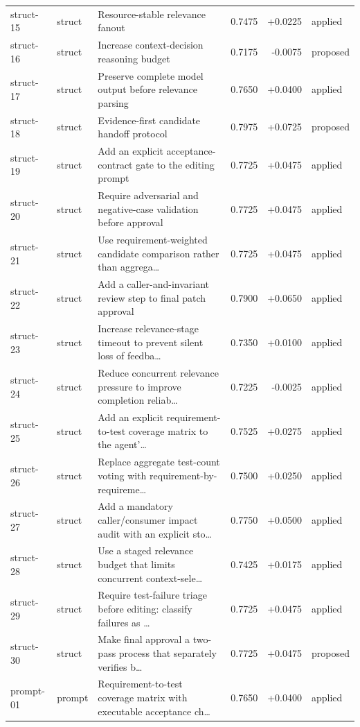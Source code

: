 \begin{center}
\begin{longtable}{llp{5.2cm}rrl}
struct-15 & struct & Resource-stable relevance fanout & 0.7475 & +0.0225 & applied \\
struct-16 & struct & Increase context-decision reasoning budget & 0.7175 & -0.0075 & proposed \\
struct-17 & struct & Preserve complete model output before relevance parsing & 0.7650 & +0.0400 & applied \\
struct-18 & struct & Evidence-first candidate handoff protocol & 0.7975 & +0.0725 & proposed \\
struct-19 & struct & Add an explicit acceptance-contract gate to the editing prompt & 0.7725 & +0.0475 & applied \\
struct-20 & struct & Require adversarial and negative-case validation before approval & 0.7725 & +0.0475 & applied \\
struct-21 & struct & Use requirement-weighted candidate comparison rather than aggrega\ldots{} & 0.7725 & +0.0475 & applied \\
struct-22 & struct & Add a caller-and-invariant review step to final patch approval & 0.7900 & +0.0650 & applied \\
struct-23 & struct & Increase relevance-stage timeout to prevent silent loss of feedba\ldots{} & 0.7350 & +0.0100 & applied \\
struct-24 & struct & Reduce concurrent relevance pressure to improve completion reliab\ldots{} & 0.7225 & -0.0025 & applied \\
struct-25 & struct & Add an explicit requirement-to-test coverage matrix to the agent'\ldots{} & 0.7525 & +0.0275 & applied \\
struct-26 & struct & Replace aggregate test-count voting with requirement-by-requireme\ldots{} & 0.7500 & +0.0250 & applied \\
struct-27 & struct & Add a mandatory caller/consumer impact audit with an explicit sto\ldots{} & 0.7750 & +0.0500 & applied \\
struct-28 & struct & Use a staged relevance budget that limits concurrent context-sele\ldots{} & 0.7425 & +0.0175 & applied \\
struct-29 & struct & Require test-failure triage before editing: classify failures as \ldots{} & 0.7725 & +0.0475 & applied \\
struct-30 & struct & Make final approval a two-pass process that separately verifies b\ldots{} & 0.7725 & +0.0475 & proposed \\
prompt-01 & prompt & Requirement-to-test coverage matrix with executable acceptance ch\ldots{} & 0.7650 & +0.0400 & applied \\

\end{longtable}
\end{center}
